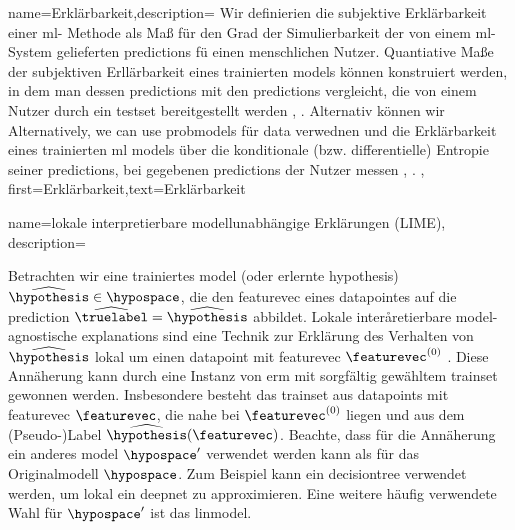 {{{{{{{			}
		
		
			{name={Erklärbarkeit},description=
				{Wir  definierien die subjektive Erklärbarkeit einer \gls{ml}- Methode als Maß für den Grad der 
						Simulierbarkeit \cite{Colin:2022aa} der von einem \gls{ml}- System gelieferten \glspl{prediction} fü einen menschlichen Nutzer. Quantiative Maße der subjektiven Erllärbarkeit eines trainierten \gls{model}s können konstruiert werden, in dem man dessen 
						\glspl{prediction} mit den \glspl{prediction} vergleicht, die von einem Nutzer durch ein \gls{testset} bereitgestellt werden \cite{Colin:2022aa}, \cite{Zhang:2024aa}. 
						Alternativ können wir 
						Alternatively, we can use \glspl{probmodel} für  \gls{data} verwednen und die Erklärbarkeit eines trainierten \gls{ml} 
						\gls{model}s über die konditionale (bzw. differentielle) Entropie seiner  \glspl{prediction}, bei gegebenen \glspl{prediction} der Nutzer messen \cite{JunXML2020}, \cite{Chen2018}. 
					},
					first={Erklärbarkeit},text={Erklärbarkeit}
				}
				
				
				{name={lokale interpretierbare modellunabhängige Erklärungen (LIME)},
					description={
						Betrachten wir  eine trainiertes  \gls{model} (oder erlernte \gls{hypothesis}) $\widehat{\hypothesis} \in \hypospace$, die den \gls{featurevec} eines  \gls{datapoint}es auf die \gls{prediction} $\widehat{\truelabel}= \widehat{\hypothesis}$ abbildet. 
						Lokale interåretierbare \gls{model}-agnostische \glspl{explanation} sind eine Technik zur Erklärung des Verhalten von $\widehat{\hypothesis}$ 
						lokal um einen \gls{datapoint} mit \gls{featurevec} $\featurevec^{(0)}$ \cite{Ribeiro2016}. 
						Diese Annäherung kann durch eine Instanz von \gls{erm} mit sorgfältig gewähltem \gls{trainset} gewonnen werden. 
						Insbesondere besteht das \gls{trainset} aus \glspl{datapoint} mit \gls{featurevec} $\featurevec$, die nahe bei 
						$\featurevec^{(0)}$ liegen und  aus dem (Pseudo-)Label $\widehat{\hypothesis}(\featurevec)$. 
						Beachte, dass für die Annäherung ein anderes \gls{model} $\hypospace'$ verwendet werden kann als für das Originalmodell $\hypospace$. 
						Zum Beispiel kann ein \gls{decisiontree} verwendet werden, um lokal ein \gls{deepnet} zu approximieren. 
						Eine weitere häufig verwendete Wahl für $\hypospace'$ ist das \gls{linmodel}.
					
}}}}}}}}
